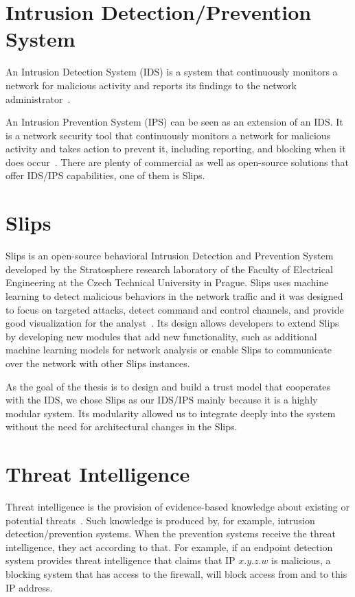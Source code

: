 \section{Intrusion Detection/Prevention System}
\label{sec:intrusion-detection-prevention-system}
An Intrusion Detection System (IDS) is a system that continuously monitors a network for malicious activity and reports its findings to the network administrator~\cite{barracuda}.

An Intrusion Prevention System (IPS) can be seen as an extension of an IDS. 
It is a network security tool that continuously monitors a network for malicious activity and takes action to prevent it, including reporting, and blocking when it does occur~\cite{vmware}.
There are plenty of commercial as well as open-source solutions that offer IDS/IPS capabilities, one of them is Slips.


\section{Slips}
\label{sec:slips}
Slips is an open-source behavioral Intrusion Detection and Prevention System developed by the Stratosphere research laboratory of the Faculty of Electrical Engineering at the Czech Technical University in Prague.
Slips uses machine learning to detect malicious behaviors in the network traffic and it was designed to focus on targeted attacks, detect command and control channels, and provide good visualization for the analyst~\cite{slips}.
Its design allows developers to extend Slips by developing new modules that add new functionality, such as additional machine learning models for network analysis or enable Slips to communicate over the network with other Slips instances.

As the goal of the thesis is to design and build a trust model that cooperates with the IDS, we chose Slips as our IDS/IPS mainly because it is a highly modular system.
Its modularity allowed us to integrate deeply into the system without the need for architectural changes in the Slips.

\section{Threat Intelligence}
\label{sec:threat-intelligence}
Threat intelligence is the provision of evidence-based knowledge about existing or potential threats~\cite{threatintelligence}.
Such knowledge is produced by, for example, intrusion 
detection/prevention systems.
When the prevention systems receive the threat intelligence, they act according to that.
For example, if an endpoint detection system provides threat intelligence that claims that IP $x.y.z.w$ is malicious, a blocking system that has access to the firewall, will block access from and to this IP address.

